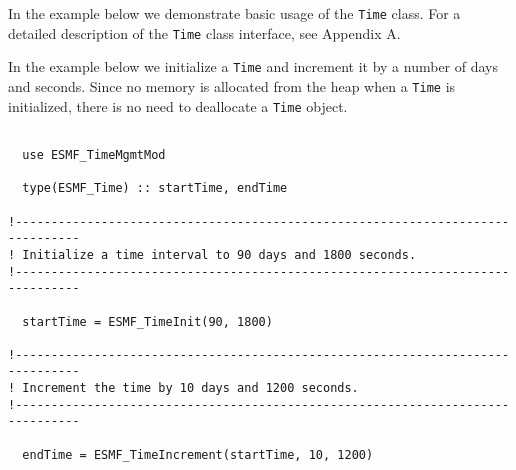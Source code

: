 
In the example below we demonstrate basic usage of the {\tt Time} class.  For
a detailed description of the {\tt Time} class interface, see 
Appendix A.

In the example below we initialize a {\tt Time} and increment it by a
number of days and seconds.  Since no memory is allocated from the heap
when a {\tt Time} is initialized, there is no need to deallocate a 
{\tt Time} object.

\begin{verbatim}

  use ESMF_TimeMgmtMod

  type(ESMF_Time) :: startTime, endTime

!-------------------------------------------------------------------------------    
! Initialize a time interval to 90 days and 1800 seconds. 
!-------------------------------------------------------------------------------

  startTime = ESMF_TimeInit(90, 1800) 

!-------------------------------------------------------------------------------    
! Increment the time by 10 days and 1200 seconds.
!-------------------------------------------------------------------------------
       
  endTime = ESMF_TimeIncrement(startTime, 10, 1200)

\end{verbatim}









